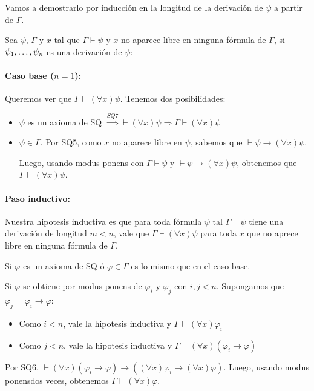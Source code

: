 \begin{demo}
	Vamos a demostrarlo por inducción en la longitud de la derivación de $\psi$ a partir de $\Gamma$.
	
	Sea $\psi$, $\Gamma$ y $x$ tal que $\Gamma\vdash\psi$ y $x$ no aparece libre en ninguna fórmula de $\Gamma$, si $\psi_1,\dots, \psi_{n}$ es una derivación de $\psi$:
	
	\paragraph{Caso base ($n = 1$):} Queremos ver que $\Gamma\vdash(\forall x)\psi$. Tenemos dos posibilidades:
	\begin{itemize}
		\item $\psi$ es un axioma de SQ $\overset{SQ7}{\Rightarrow} \vdash (\forall x)\psi \Rightarrow \Gamma\vdash(\forall x)\psi$
		\item $\psi\in\Gamma$. Por SQ5, como $x$ no aparece libre en $\psi$, sabemos que $\vdash\psi\to(\forall x)\psi$.
		
		Luego, usando modus ponens con $\Gamma\vdash\psi$ y $\vdash\psi\to(\forall x)\psi$, obtenemos que $\Gamma\vdash(\forall x)\psi$.
	\end{itemize}
\end{demo}
\begin{demoPart}
	\paragraph{Paso inductivo:} Nuestra hipotesis inductiva es que para toda fórmula $\psi$ tal $\Gamma\vdash\psi$ tiene una derivación de longitud $ m < n$, vale que $\Gamma\vdash(\forall x)\psi$ para toda $x$ que no aprece libre en ninguna fórmula de $\Gamma$. 
	
	Si $\varphi$ es un axioma de SQ ó $\varphi\in\Gamma$ es lo mismo que en el caso base.
	
	Si $\varphi$ se obtiene por modus ponens de $\varphi_i$ y $\varphi_j$ con $i,j < n$. Supongamos que $\varphi_j = \varphi_i\to\varphi$:
	\begin{itemize}
		\item Como $i < n$, vale la hipotesis inductiva y $\Gamma\vdash(\forall x)\varphi_i$
		\item Como $j < n$, vale la hipotesis inductiva y $\Gamma\vdash(\forall x)(\varphi_i\to\varphi)$
	\end{itemize}

Por SQ6, $\vdash(\forall x)(\varphi_i\to\varphi)\to((\forall x)\varphi_i\to(\forall x)\varphi)$. Luego, usando modus ponensdos veces, obtenemos $\Gamma\vdash(\forall x)\varphi$.
\end{demoPart}

